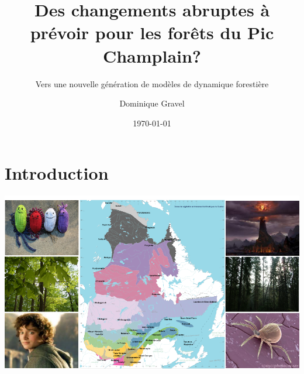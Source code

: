 \documentclass{eecslides}
\title[Forêts-CC]{Des changements abruptes à prévoir pour les forêts du Pic Champlain?}
\subtitle{Vers une nouvelle génération de modèles de dynamique forestière}
\author[D. Gravel]{Dominique Gravel}
\institute[Chaire de recherche EEC]{UQAR -- Chaire de Recherche EEC}
\date{\today}
\begin{document}

	\begin{frame}[plain]
		\titlepage
	\end{frame}
	
	\section{Introduction}





	\begin{frame}
		\begin{center}
			\includegraphics[height=0.75\textheight]{bioclim}
		\end{center}
	\end{frame}

\end{document}
